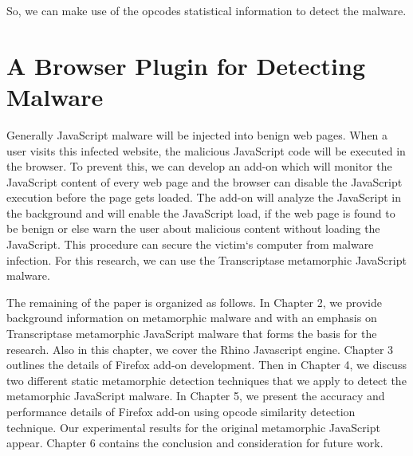 So, we can make use of the opcodes statistical information to detect the malware. 

\section{A Browser Plugin for Detecting Malware}

Generally JavaScript malware will be injected into benign web pages. When a user visits this infected website, the malicious JavaScript code will be executed in the browser. To prevent this, we can develop an add-on which will monitor the JavaScript content of every web page and the browser can disable the JavaScript execution before the page gets loaded. The add-on will analyze the JavaScript in the background and will enable the JavaScript load, if the web page is found to be benign or else warn the user about malicious content without loading the JavaScript. This procedure can secure the victim`s computer from malware infection. For this research, we can use the Transcriptase metamorphic JavaScript malware.

The remaining of the paper is organized as follows. In Chapter 2, we provide background information on metamorphic malware and with an emphasis on Transcriptase metamorphic JavaScript malware that forms the basis for the research. Also in this chapter, we cover the Rhino Javascript engine. Chapter 3 outlines the details of Firefox add-on development. Then in Chapter 4, we discuss two different static metamorphic detection techniques that we apply to detect the metamorphic JavaScript malware. In Chapter 5, we present the accuracy and performance details of Firefox add-on using opcode similarity detection technique. Our experimental results for the original metamorphic JavaScript appear. Chapter 6 contains the conclusion and consideration for future work.